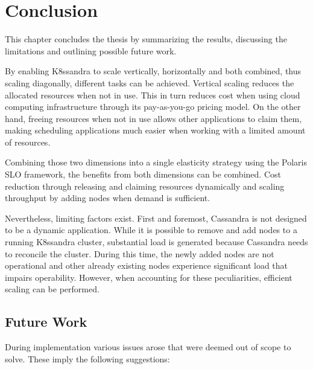 \chapter{Conclusion}
\label{ch:conclusion}


This chapter concludes the thesis by summarizing the results, discussing the limitations and outlining possible future work.

By enabling K8ssandra to scale vertically, horizontally and both combined, thus scaling diagonally, different tasks can be achieved. Vertical scaling reduces the allocated resources when not in use. This in turn reduces cost when using cloud computing infrastructure through its pay-as-you-go pricing model. On the other hand, freeing resources when not in use allows other applications to claim them, making scheduling applications much easier when working with a limited amount of resources.

Combining those two dimensions into a single elasticity strategy using the Polaris SLO framework, the benefits from both dimensions can be combined. Cost reduction through releasing and claiming resources dynamically and scaling throughput by adding nodes when demand is sufficient.

Nevertheless, limiting factors exist. First and foremost, Cassandra is not designed to be a dynamic application. While it is possible to remove and add nodes to a running K8ssandra cluster, substantial load is generated because Cassandra needs to reconcile the cluster. During this time, the newly added nodes are not operational and other already existing nodes experience significant load that impairs operability. However, when accounting for these peculiarities, efficient scaling can be performed.

\pagebreak

\section{Future Work}
\label{sec:future-work}

During implementation various issues arose that were deemed out of scope to solve. These imply the following suggestions:


